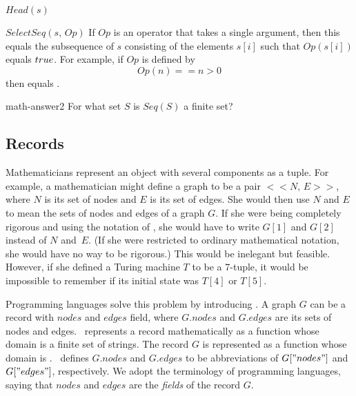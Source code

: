 \documentclass[fleqn,leqno]{article}
\begin{document}
\begin{describe}{$Head(s)$}
\item[$SelectSeq(s,\,Op)$] If 
$Op$ is an operator that takes a single
argument, then this equals the subsequence of $s$ consisting of the
elements $s[i]$ such that $Op(s[i])$ equals $\TRUE$.  For example, if
$Op$ is defined by
 \[ Op(n) == n > 0\]
then  equals
 .
\end{describe}
\begin{aquestion}{math-answer2}
For what set $S$ is $Seq(S)$ a finite set?
\end{aquestion}

% 


\subsection[Records]{Records}

Mathematicians represent an object with several components as a tuple.
For example, a mathematician might define a graph to be 
a pair $<<N,\,E>>$, where $N$ is its set of nodes
and $E$ is its set of edges.
She would then use $N$ and $E$ to mean the sets of nodes and edges of
a graph $G$.  If she were being completely rigorous and using the
notation of \tlaplus, she would have to write $G[1]$ and $G[2]$
instead of $N$ and~$E$.  (If she were restricted to ordinary
mathematical notation, she would have no way to be rigorous.)  This
would be inelegant but feasible.  However, if she defined a Turing
machine $T$ to be a 7-tuple, it would be impossible to remember if its
initial state was $T[4]$ or $T[5]$.

Programming languages solve this problem by introducing   
  .  
A graph $G$ can be a record with $nodes$ and $edges$ field, where
$G.nodes$ and $G.edges$ are its sets of nodes and edges.  \tlaplus\
represents a record mathematically as a function whose domain is a
finite set of strings.  The record $G$ is represented as a function
whose domain is \tlabox{\{"nodes",\,"edges"\}}.  \tlaplus\ defines
$G.nodes$ and $G.edges$ to be abbreviations of $G["nodes"]$ and
$G["edges"]$, respectively.  We adopt the terminology of programming
languages, saying that $nodes$ and $edges$ are the
\emph{fields} of the record $G$.
\end{document}
